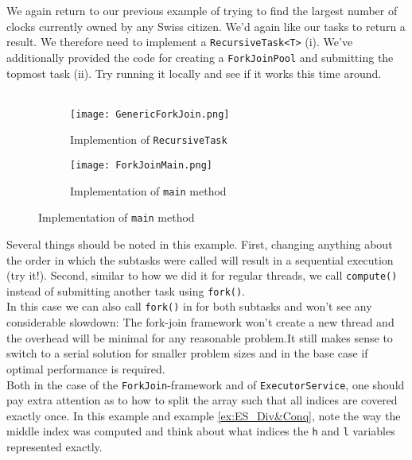 \documentclass[main.tex]{subfiles}
\begin{document}
\begin{example}
    We again return to our previous example of trying to find the largest number of clocks currently owned by any Swiss citizen. We'd again like our tasks to return a result. We therefore need to implement a \texttt{RecursiveTask<T>} (i). We've additionally provided the code for creating a \texttt{ForkJoinPool} and submitting the topmost task (ii). Try running it locally and see if it works this time around. \\
    \\
    \begin{figure}[H]
        \centering
        \begin{subfigure}{.5\textwidth}
            \centering
            \texttt{[image: GenericForkJoin.png]}
            \caption{Implemention of \texttt{RecursiveTask}}
        \end{subfigure}%
        \begin{subfigure}{.5\textwidth}
            \centering
            \texttt{[image: ForkJoinMain.png]}
            \caption{Implementation of \texttt{main} method}
        \end{subfigure}
    \end{figure}
    \noindent Several things should be noted in this example. First, changing anything about the order in which the subtasks were called will result in a sequential execution (try it!). Second, similar to how we did it for regular threads, we call \texttt{compute()} instead of submitting another task using \texttt{fork()}.\\
    In this case we can also call \texttt{fork()} in for both subtasks and won't see any considerable slowdown: The fork-join framework won't create a new thread and the overhead will be minimal for any reasonable problem.It still makes sense to switch to a serial solution for smaller problem sizes and in the base case if optimal performance is required. \\
    Both in the case of the \texttt{ForkJoin}-framework and of \texttt{ExecutorService}, one should pay extra attention as to how to split the array such that all indices are covered exactly once. In this example and example \ref{ex:ES_Div&Conq}, note the way the middle index was computed and think about what indices the \texttt{h} and \texttt{l} variables represented exactly.
\end{example}
\pagebreak
\end{document}
